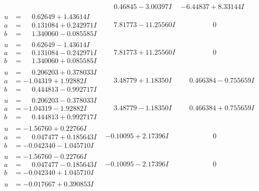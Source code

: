 \documentclass[1p]{elsarticle_modified}
\theoremstyle{definition}
\begin{document}
$$\begin{array}{c|c|c}
 & \phantom{-}0.46845 - 3.00397 I & -6.44837 + 8.33144 I \\ \hline\begin{aligned}
u &= \phantom{-}0.62649 + 1.43614 I \\
a &= \phantom{-}0.131084 + 0.242971 I \\
b &= \phantom{-}1.340060 - 0.085585 I\end{aligned}
 & \phantom{-}7.81773 - 11.25560 I & \phantom{-0.000000 } 0 \\ \hline\begin{aligned}
u &= \phantom{-}0.62649 - 1.43614 I \\
a &= \phantom{-}0.131084 - 0.242971 I \\
b &= \phantom{-}1.340060 + 0.085585 I\end{aligned}
 & \phantom{-}7.81773 + 11.25560 I & \phantom{-0.000000 } 0 \\ \hline\begin{aligned}
u &= \phantom{-}0.206203 + 0.378033 I \\
a &= -1.04319 + 1.92882 I \\
b &= \phantom{-}0.444813 - 0.992717 I\end{aligned}
 & \phantom{-}3.48779 + 1.18350 I & \phantom{-}0.466384 - 0.755659 I \\ \hline\begin{aligned}
u &= \phantom{-}0.206203 - 0.378033 I \\
a &= -1.04319 - 1.92882 I \\
b &= \phantom{-}0.444813 + 0.992717 I\end{aligned}
 & \phantom{-}3.48779 - 1.18350 I & \phantom{-}0.466384 + 0.755659 I \\ \hline\begin{aligned}
u &= -1.56760 + 0.22766 I \\
a &= \phantom{-}0.047477 + 0.185643 I \\
b &= -0.042340 - 1.045710 I\end{aligned}
 & -0.10095 + 2.17396 I & \phantom{-0.000000 } 0 \\ \hline\begin{aligned}
u &= -1.56760 - 0.22766 I \\
a &= \phantom{-}0.047477 - 0.185643 I \\
b &= -0.042340 + 1.045710 I\end{aligned}
 & -0.10095 - 2.17396 I & \phantom{-0.000000 } 0 \\ \hline\begin{aligned}
u &= -0.017667 + 0.390853 I \\

\end{aligned}
\end{array}$$
\end{document}
